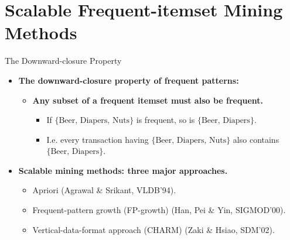 \section{Scalable Frequent-itemset Mining Methods}

\begin{frame}{The Downward-closure Property}
	\begin{itemize}
		\item \textbf{The downward-closure property of frequent patterns:}
		      \begin{itemize}
			      \item \textbf{\color{airforceblue}Any subset of a frequent itemset
				            must also be frequent.}
			            \begin{itemize}
				            \item If $\{\text{Beer, Diapers, Nuts}\}$ is frequent, so is
				                  $\{\text{Beer, Diapers}\}$.
				            \item I.e. every transaction having $\{\text{Beer, Diapers,
						                  Nuts}\}$ also contains $\{\text{Beer, Diapers}\}$.
			            \end{itemize}
		      \end{itemize}
		\item \textbf{Scalable mining methods: three major approaches.}
		      \begin{itemize}
			      \item Apriori (Agrawal \& Srikant, VLDB'94).
			      \item Frequent-pattern growth (FP-growth) (Han, Pei \& Yin,
			            SIGMOD'00).
			      \item Vertical-data-format approach (CHARM) (Zaki \& Hsiao, SDM'02).
		      \end{itemize}
	\end{itemize}
\end{frame}

